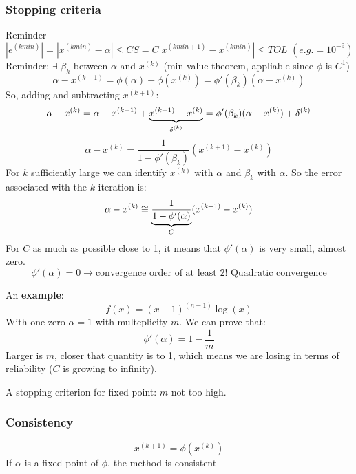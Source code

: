 \subsubsection{Stopping criteria}
Reminder
$$
\left|e^{(kmin)}\right|=\left|x^{(kmin)}-\alpha\right|\leq CS=C\left|x^{(kmin+1)}-x^{(kmin)}\right|\leq TOL\,\,(e.g.=10^{-9})
$$
Reminder: $\exists\,\,\beta_k$ between $\alpha$ and $x^{(k)}$ (min value theorem, appliable since $\phi$ is $C^1$)
$$
\alpha-x^{(k+1)}=\phi(\alpha)-\phi(x^{(k)})=\phi'(\beta_k)(\alpha-x^{(k)})
$$
So, adding and subtracting $x^{(k+1)}$:
$$
\alpha-x^{(k)}=\alpha-x^{(k+1)}+\underlabel{x^{(k+1)}-x^{(k)}}{$\delta^{(k)}$}=\phi'(\beta_k)(\alpha-x^{(k)})+\delta^{(k)}
$$
$$
\alpha-x^{(k)}=\frac{1}{1-\phi'(\beta_k)}(x^{(k+1)}-x^{(k)})
$$
For $k$ sufficiently large we can identify $x^{(k)}$ with $\alpha$ and $\beta_k$ with $\alpha$. So the error associated with the $k$ iteration is:
$$
\alpha-x^{(k)}\cong\underlabel{\frac{1}{1-\phi'(\alpha)}}{$C$}(x^{(k+1)}-x^{(k)})
$$
For $C$ as much as possible close to 1, it means that $\phi'(\alpha)$ is very small, almost zero.
$$
\phi'(\alpha)=0\rightarrow\text{convergence order of at least 2! Quadratic convergence}
$$

An \textbf{example}:
$$
f(x)=(x-1)^{(n-1)}\log(x)
$$
With one zero $\alpha=1$ with multeplicity $m$. We can prove that:
$$\phi'(\alpha)=1-\frac{1}{m}$$
Larger is $m$, closer that quantity is to 1, which means we are losing in terms of reliability ($C$ is growing to infinity).

\begin{figure}[!ht]
    \begin{minipage}{\linewidth}
        \centering
    \end{minipage}
\end{figure}

A stopping criterion for fixed point: $m$ not too high.

\subsubsection{Consistency}
$$
x^{(k+1)}=\phi(x^{(k)})
$$
If $\alpha$ is a fixed point of $\phi$, the method is consistent